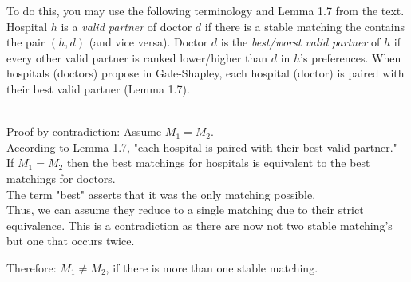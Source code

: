 \documentclass[11pt]{article}
\theoremstyle{definition}
\theoremstyle{theorem}
\newcommand{\solution}{\medskip\noindent{\color{DarkBlue}\textbf{Solution:}}}
\begin{document}
\begin{enumerate}[label=(\alph*)]
To do this, you may use the following terminology and Lemma 1.7 from the text. Hospital $h$ is a \emph{valid partner} of doctor $d$ if there is a stable matching the contains the pair $(h,d)$ (and vice versa). Doctor $d$ is the \emph{best/worst valid partner} of $h$ if every other valid partner is ranked lower/higher than $d$ in $h$'s preferences. When hospitals (doctors) propose in Gale-Shapley, each hospital (doctor) is paired with their best valid partner (Lemma 1.7). 

\solution \\

Proof by contradiction: Assume $M_1 = M_2$. \\

According to Lemma 1.7, "each hospital is paired with their best valid partner." \\




If  $M_1 = M_2$ then the best matchings for hospitals is equivalent to the best matchings for doctors. \\
The term "best" asserts that it was the only matching possible. \\
Thus, we can assume they reduce to a single matching due to their strict equivalence.
This is a contradiction as there are now not two stable matching's but one that occurs twice.

Therefore: $M_1 \neq M_2$, if there is more than one stable matching. \\




\end{enumerate}
\end{document}
